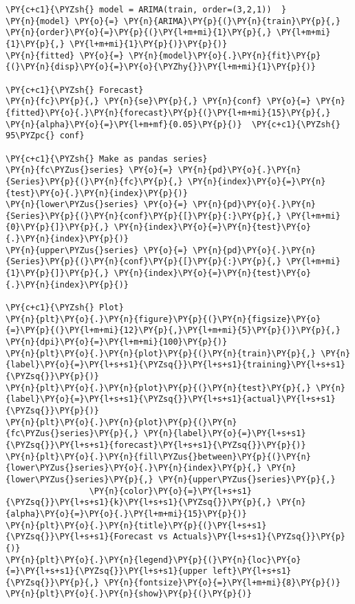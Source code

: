 \begin{codebox}[breakable, size=fbox, boxrule=1pt, pad at break*=1mm,colback=cellbackground, colframe=cellborder]
\begin{Verbatim}[commandchars=\\\{\}]
\PY{c+c1}{\PYZsh{} model = ARIMA(train, order=(3,2,1))  }
\PY{n}{model} \PY{o}{=} \PY{n}{ARIMA}\PY{p}{(}\PY{n}{train}\PY{p}{,} \PY{n}{order}\PY{o}{=}\PY{p}{(}\PY{l+m+mi}{1}\PY{p}{,} \PY{l+m+mi}{1}\PY{p}{,} \PY{l+m+mi}{1}\PY{p}{)}\PY{p}{)}  
\PY{n}{fitted} \PY{o}{=} \PY{n}{model}\PY{o}{.}\PY{n}{fit}\PY{p}{(}\PY{n}{disp}\PY{o}{=}\PY{o}{\PYZhy{}}\PY{l+m+mi}{1}\PY{p}{)}  

\PY{c+c1}{\PYZsh{} Forecast}
\PY{n}{fc}\PY{p}{,} \PY{n}{se}\PY{p}{,} \PY{n}{conf} \PY{o}{=} \PY{n}{fitted}\PY{o}{.}\PY{n}{forecast}\PY{p}{(}\PY{l+m+mi}{15}\PY{p}{,} \PY{n}{alpha}\PY{o}{=}\PY{l+m+mf}{0.05}\PY{p}{)}  \PY{c+c1}{\PYZsh{} 95\PYZpc{} conf}

\PY{c+c1}{\PYZsh{} Make as pandas series}
\PY{n}{fc\PYZus{}series} \PY{o}{=} \PY{n}{pd}\PY{o}{.}\PY{n}{Series}\PY{p}{(}\PY{n}{fc}\PY{p}{,} \PY{n}{index}\PY{o}{=}\PY{n}{test}\PY{o}{.}\PY{n}{index}\PY{p}{)}
\PY{n}{lower\PYZus{}series} \PY{o}{=} \PY{n}{pd}\PY{o}{.}\PY{n}{Series}\PY{p}{(}\PY{n}{conf}\PY{p}{[}\PY{p}{:}\PY{p}{,} \PY{l+m+mi}{0}\PY{p}{]}\PY{p}{,} \PY{n}{index}\PY{o}{=}\PY{n}{test}\PY{o}{.}\PY{n}{index}\PY{p}{)}
\PY{n}{upper\PYZus{}series} \PY{o}{=} \PY{n}{pd}\PY{o}{.}\PY{n}{Series}\PY{p}{(}\PY{n}{conf}\PY{p}{[}\PY{p}{:}\PY{p}{,} \PY{l+m+mi}{1}\PY{p}{]}\PY{p}{,} \PY{n}{index}\PY{o}{=}\PY{n}{test}\PY{o}{.}\PY{n}{index}\PY{p}{)}

\PY{c+c1}{\PYZsh{} Plot}
\PY{n}{plt}\PY{o}{.}\PY{n}{figure}\PY{p}{(}\PY{n}{figsize}\PY{o}{=}\PY{p}{(}\PY{l+m+mi}{12}\PY{p}{,}\PY{l+m+mi}{5}\PY{p}{)}\PY{p}{,} \PY{n}{dpi}\PY{o}{=}\PY{l+m+mi}{100}\PY{p}{)}
\PY{n}{plt}\PY{o}{.}\PY{n}{plot}\PY{p}{(}\PY{n}{train}\PY{p}{,} \PY{n}{label}\PY{o}{=}\PY{l+s+s1}{\PYZsq{}}\PY{l+s+s1}{training}\PY{l+s+s1}{\PYZsq{}}\PY{p}{)}
\PY{n}{plt}\PY{o}{.}\PY{n}{plot}\PY{p}{(}\PY{n}{test}\PY{p}{,} \PY{n}{label}\PY{o}{=}\PY{l+s+s1}{\PYZsq{}}\PY{l+s+s1}{actual}\PY{l+s+s1}{\PYZsq{}}\PY{p}{)}
\PY{n}{plt}\PY{o}{.}\PY{n}{plot}\PY{p}{(}\PY{n}{fc\PYZus{}series}\PY{p}{,} \PY{n}{label}\PY{o}{=}\PY{l+s+s1}{\PYZsq{}}\PY{l+s+s1}{forecast}\PY{l+s+s1}{\PYZsq{}}\PY{p}{)}
\PY{n}{plt}\PY{o}{.}\PY{n}{fill\PYZus{}between}\PY{p}{(}\PY{n}{lower\PYZus{}series}\PY{o}{.}\PY{n}{index}\PY{p}{,} \PY{n}{lower\PYZus{}series}\PY{p}{,} \PY{n}{upper\PYZus{}series}\PY{p}{,} 
                 \PY{n}{color}\PY{o}{=}\PY{l+s+s1}{\PYZsq{}}\PY{l+s+s1}{k}\PY{l+s+s1}{\PYZsq{}}\PY{p}{,} \PY{n}{alpha}\PY{o}{=}\PY{o}{.}\PY{l+m+mi}{15}\PY{p}{)}
\PY{n}{plt}\PY{o}{.}\PY{n}{title}\PY{p}{(}\PY{l+s+s1}{\PYZsq{}}\PY{l+s+s1}{Forecast vs Actuals}\PY{l+s+s1}{\PYZsq{}}\PY{p}{)}
\PY{n}{plt}\PY{o}{.}\PY{n}{legend}\PY{p}{(}\PY{n}{loc}\PY{o}{=}\PY{l+s+s1}{\PYZsq{}}\PY{l+s+s1}{upper left}\PY{l+s+s1}{\PYZsq{}}\PY{p}{,} \PY{n}{fontsize}\PY{o}{=}\PY{l+m+mi}{8}\PY{p}{)}
\PY{n}{plt}\PY{o}{.}\PY{n}{show}\PY{p}{(}\PY{p}{)}
\end{Verbatim}
\end{codebox}

